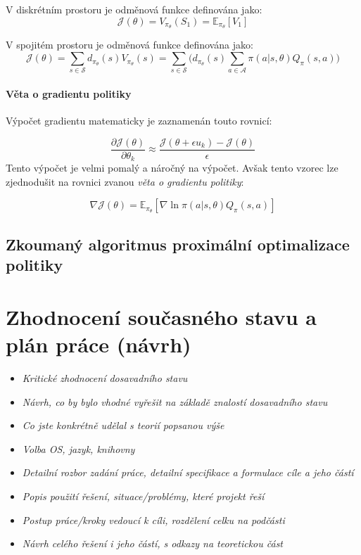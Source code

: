 V diskrétním prostoru je odměnová funkce definována jako:
\begin{equation}
  \mathcal{J}(\theta) = V_{\pi_\theta}(S_1) = \mathbb{E}_{\pi_\theta}[V_1]
\end{equation}

V spojitém prostoru je odměnová funkce definována jako:
\begin{equation}
  \mathcal{J}(\theta) = \sum_{s \in \mathcal{S}} d_{\pi_\theta}(s) V_{\pi_\theta}(s) = \sum_{s \in \mathcal{S}} \Big( d_{\pi_\theta}(s) \sum_{a \in \mathcal{A}} \pi(a \vert s, \theta) Q_\pi(s, a) \Big)
  \end{equation}

\subsubsection*{Věta o gradientu politiky}
Výpočet gradientu matematicky je zaznamenán touto rovnicí:

\begin{equation}
  \frac{\partial \mathcal{J}(\theta)}{\partial \theta_k} \approx \frac{\mathcal{J}(\theta + \epsilon u_k) - \mathcal{J}(\theta)}{\epsilon}
\end{equation}
Tento výpočet je velmi pomalý a náročný na výpočet.
Avšak tento vzorec lze zjednodušit na rovnici zvanou \emph{věta o gradientu politiky}:

\begin{equation}
  \nabla \mathcal{J}(\theta) = \mathbb{E}_{\pi_\theta} [\nabla \ln \pi(a \vert s, \theta) Q_\pi(s, a)]
\end{equation}


\section{Zkoumaný algoritmus proximální optimalizace politiky}
\label{sec:proximalni-optimalizace-politiky}


\chapter{Zhodnocení současného stavu a plán práce (návrh)}
\label{navrh}
\begin{itemize}
  \item \emph {Kritické zhodnocení dosavadního stavu}
  \item \emph {Návrh, co by bylo vhodné vyřešit na základě znalostí dosavadního stavu}
  \item \emph {Co jste konkrétně udělal s teorií popsanou výše}
  \item \emph {Volba OS, jazyk, knihovny}
  \item \emph {Detailní rozbor zadání práce, detailní specifikace a formulace cíle a jeho částí}
  \item \emph {Popis použití řešení, situace/problémy, které projekt řeší}
  \item \emph {Postup práce/kroky vedoucí k cíli, rozdělení celku na podčásti}
  \item \emph {Návrh celého řešení i jeho částí, s odkazy na teoretickou část}
\end{itemize}

